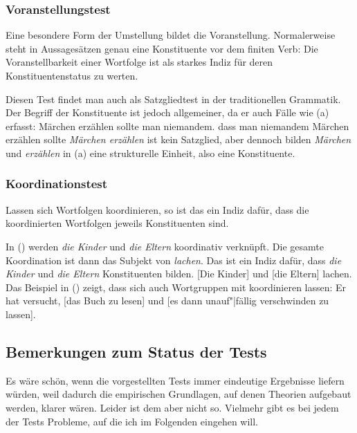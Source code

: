 \subsubsection{Voranstellungstest}

Eine besondere Form der Umstellung bildet die Voranstellung. Normalerweise steht
in Aussagesätzen genau eine Konstituente vor dem finiten Verb:
\eal
\label{bsp-v2}
\zl
Die Voranstellbarkeit einer Wortfolge ist als starkes Indiz für deren Konstituentenstatus
zu werten.

Diesen Test findet man auch als Satzgliedtest in der traditionellen Grammatik. Der
Begriff der Konstituente ist jedoch allgemeiner, da er auch Fälle wie (a) erfasst:
\eal
\ex Märchen erzählen sollte man niemandem.
\ex dass man niemandem Märchen erzählen sollte
\zl
\emph{Märchen erzählen} ist kein Satzglied, aber dennoch bilden \emph{Märchen} und
\emph{erzählen} in (a) eine strukturelle Einheit, also eine Konstituente.
  

\subsubsection{Koordinationstest}

Lassen sich Wortfolgen koordinieren, so ist das ein Indiz dafür, dass die koordinierten Wortfolgen
jeweils Konstituenten sind.

In () werden \emph{die Kinder} und \emph{die Eltern} koordinativ verknüpft.
Die gesamte Koordination ist dann das Subjekt von \emph{lachen}.
Das ist ein Indiz dafür, dass \emph{die Kinder}
und \emph{die Eltern} Konstituenten bilden.
\ea
{}[Die Kinder] und [die Eltern] lachen.
\z
Das Beispiel in () zeigt, dass sich auch Wortgruppen mit \zui koordinieren lassen:
\ea
Er hat versucht, [das Buch zu lesen] und [es dann unauf"|fällig verschwinden zu lassen].
\z

\subsection{Bemerkungen zum Status der Tests}
\label{sec-status-der-ktests}

Es wäre schön, wenn die vorgestellten Tests immer eindeutige Ergebnisse liefern würden,
weil dadurch die empirischen Grundlagen, auf denen Theorien aufgebaut werden, klarer
wären. Leider ist dem aber nicht so. Vielmehr gibt es bei jedem der Tests Probleme,
auf die ich im Folgenden eingehen will.

